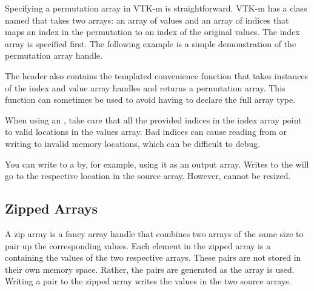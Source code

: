 Specifying a permutation array in VTK-m is straightforward. VTK-m has a
class named  that takes two arrays: an
array of values and an array of indices that maps an index in the
permutation to an index of the original values. The index array is
specified first. The following example is a simple demonstration of the
permutation array handle.


The  header also contains the
templated convenience function  that
takes instances of the index and value array handles and returns a
permutation array. This function can sometimes be used to avoid having to
declare the full array type.


\begin{commonerrors}
  When using an , take care that all
  the provided indices in the index array point to valid locations in the
  values array. Bad indices can cause reading from or writing to invalid
  memory locations, which can be difficult to debug.
\end{commonerrors}

\begin{didyouknow}
  You can write to a  by, for
  example, using it as an output array. Writes to the
   will go to the respective
  location in the source array. However,
   cannot be resized.
\end{didyouknow}


\subsection{Zipped Arrays}
\label{sec:ZippedArrays}


A zip array is a fancy array handle that combines two arrays of the same
size to pair up the corresponding values. Each element in the zipped array
is a  containing the values of the two respective arrays. These
pairs are not stored in their own memory space. Rather, the pairs are
generated as the array is used. Writing a pair to the zipped array writes
the values in the two source arrays.

